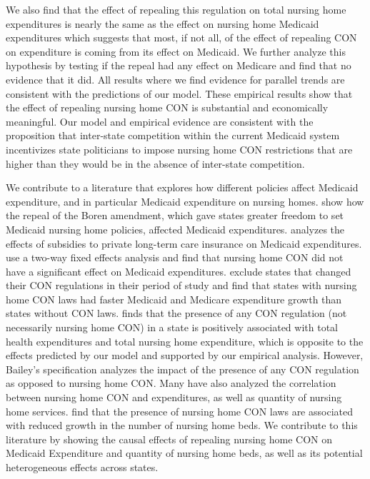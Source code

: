 \documentclass[../Main.tex]{subfiles}
\begin{document}
We also find that the effect of repealing this regulation on total nursing home expenditures is nearly the same as the effect on nursing home Medicaid expenditures which suggests that most, if not all, of the effect of repealing CON on expenditure is coming from its effect on Medicaid. We further analyze this hypothesis by testing if the repeal had any effect on Medicare and find that no evidence that it did. All results where we find evidence for parallel trends are consistent with the predictions of our model. These empirical results show that the effect of repealing nursing home CON is substantial and economically meaningful. Our model and empirical evidence are consistent with the proposition that inter-state competition within the current Medicaid system incentivizes state politicians to impose nursing home CON restrictions that are higher than they would be in the absence of inter-state competition.

We contribute to a literature that explores how different policies affect Medicaid expenditure, and in particular Medicaid expenditure on nursing homes. \citet{grabowski2004recent} show how the repeal of the Boren amendment, which gave states greater freedom to set Medicaid nursing home policies, affected Medicaid expenditures. \citet{goda2011impact} analyzes the effects of subsidies to private long-term care insurance on Medicaid expenditures. \citet{grabowski2003effects} use a two-way fixed effects analysis and find that nursing home CON did not have a significant effect on Medicaid expenditures. \citet{rahman2016impact} exclude states that changed their CON regulations in their period of study and find that states with nursing home CON laws had faster Medicaid and Medicare expenditure growth than states without CON laws. \citet{bailey2019can} finds that the presence of any CON regulation (not necessarily nursing home CON) in a state is positively associated with total health expenditures and total nursing home expenditure, which is opposite to the effects predicted by our model and supported by our empirical analysis. However, Bailey’s specification analyzes the impact of the presence of any CON regulation as opposed to nursing home CON. Many have also analyzed the correlation between nursing home CON and expenditures, as well as quantity of nursing home services. \citet{harrington1997effect,swan1991certificate,zinn1994market} find that the presence of nursing home CON laws are associated with reduced growth in the number of nursing home beds. We contribute to this literature by showing the causal effects of repealing nursing home CON on Medicaid Expenditure and quantity of nursing home beds, as well as its potential heterogeneous effects across states.   
\end{document}
